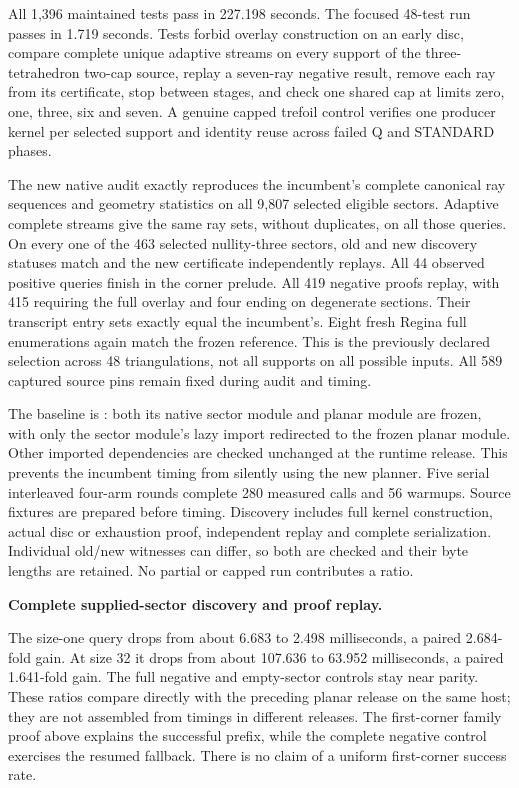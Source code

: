 All 1,396 maintained tests pass in 227.198 seconds. The focused 48-test
run passes in 1.719 seconds. Tests forbid overlay construction on an early
disc, compare complete unique adaptive streams on every support of the
three-tetrahedron two-cap source, replay a seven-ray negative result,
remove each ray from its certificate, stop between stages, and check one
shared cap at limits zero, one, three, six and seven. A genuine capped
trefoil control verifies one producer kernel per selected support and
identity reuse across failed Q and STANDARD phases.

The new native audit exactly reproduces the incumbent's complete canonical
ray sequences and geometry statistics on all 9,807 selected eligible
sectors. Adaptive complete streams give the same ray sets, without
duplicates, on all those queries. On every one of the 463 selected
nullity-three sectors, old and new discovery statuses match and the new
certificate independently replays. All 44 observed positive queries finish
in the corner prelude. All 419 negative proofs replay, with 415 requiring
the full overlay and four ending on degenerate sections. Their transcript
entry sets exactly equal the incumbent's. Eight fresh Regina full
enumerations again match the frozen reference. This is the previously
declared selection across 48 triangulations, not all supports on all
possible inputs. All 589 captured source pins remain fixed during audit
and timing.

The baseline is : both its native sector module and planar
module are frozen, with only the sector module's lazy import redirected to
the frozen planar module. Other imported dependencies are checked unchanged
at the runtime release. This prevents the incumbent timing from silently
using the new planner. Five serial interleaved four-arm rounds complete
280 measured calls and 56 warmups. Source fixtures are prepared before
timing. Discovery includes full kernel construction, actual disc or
exhaustion proof, independent replay and complete serialization. Individual
old/new witnesses can differ, so both are checked and their byte lengths
are retained. No partial or capped run contributes a ratio.

\begin{samepage}
\noindent\textbf{Complete supplied-sector discovery and proof replay.}

\end{samepage}

The size-one query drops from about 6.683 to 2.498 milliseconds, a paired
2.684-fold gain. At size 32 it drops from about 107.636 to 63.952
milliseconds, a paired 1.641-fold gain. The full negative and empty-sector
controls stay near parity. These ratios compare directly with the preceding
planar release on the same host; they are not assembled from timings in
different releases. The first-corner family proof above explains the
successful prefix, while the complete negative control exercises the
resumed fallback. There is no claim of a uniform first-corner success rate.

